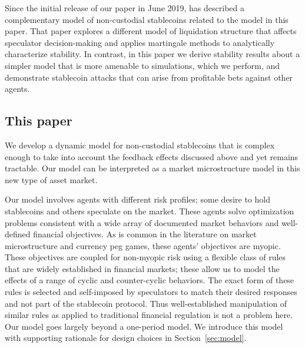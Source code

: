 Since the initial release of our paper in June 2019, \cite{klagesmundt2020} has described a complementary model of non-custodial stablecoins related to the model in this paper. That paper explores a different model of liquidation structure that affects speculator decision-making and applies martingale methods to analytically characterize stability. In contrast, in this paper we derive stability results about a simpler model that is more amenable to simulations, which we perform, and demonstrate stablecoin attacks that can arise from profitable bets against other agents.






\subsection{This paper}
We develop a dynamic model for non-custodial stablecoins that is complex enough to take into account the feedback effects discussed above and yet remains tractable. Our model can be interpreted as a market microstructure model in this new type of asset market.

Our model involves agents with different risk profiles; some desire to hold stablecoins and others speculate on the market. These agents solve optimization problems consistent with a wide array of documented market behaviors and well-defined financial objectives. As is common in the literature on market microstructure and currency peg games, these agents' objectives are myopic. These objectives are coupled for non-myopic risk using a flexible class of rules that are widely established in financial markets; these allow us to model the effects of a range of cyclic and counter-cyclic behaviors. The exact form of these rules is selected and self-imposed by speculators to match their desired responses and not part of the stablecoin protocol. Thus well-established manipulation of similar rules as applied to traditional financial regulation is not a problem here. Our model goes largely beyond a one-period model. We introduce this model with supporting rationale for design choices in Section~\ref{sec:model}.


